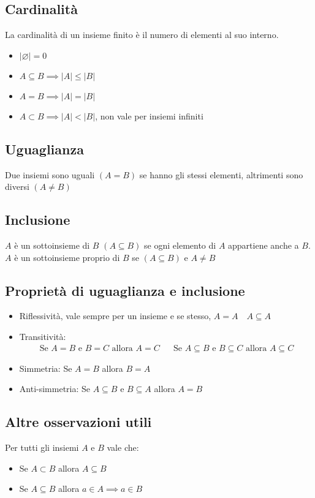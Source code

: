 \documentclass{article}
\begin{document}
\subsection*{Cardinalità}
La cardinalità di un insieme finito è il numero di elementi al suo interno.
\begin{itemize}
    \item \(\lvert \varnothing \rvert = 0\)
    \item \(A \subseteq B \implies \lvert A \rvert \leq \lvert B \rvert\)
    \item \(A = B \implies \lvert A \rvert = \lvert B\rvert \)
    \item \(A \subset B \implies \lvert A \rvert < \lvert B \rvert\), non vale per insiemi infiniti
\end{itemize}
\subsection*{Uguaglianza}
Due insiemi sono uguali \((A = B)\) se hanno gli stessi elementi, altrimenti sono diversi \((A \not= B)\)
\subsection*{Inclusione}
\(A\) è un sottoinsieme di \(B\) \((A \subseteq B)\) se ogni elemento di \(A\) appartiene anche a \(B\).
\(A\) è un sottoinsieme proprio di \(B\) se  \((A \subseteq B) \text{ e } A \neq B\)
\subsection*{Proprietà di uguaglianza e inclusione}
\begin{itemize}
    \item Riflessività, vale sempre per un insieme e se stesso, \(A = A \quad A \subseteq A\)
    \item Transitività:
          \begin{align*}
              \text{Se } A = B \text{ e } B = C \text{ allora } A = C &  & \text{Se } A \subseteq B \text{ e } B \subseteq C \text{ allora } A \subseteq C
          \end{align*}
    \item Simmetria: Se \(A = B\) allora \(B = A\)
    \item Anti-simmetria: Se \(A \subseteq B\) e \(B \subseteq A\) allora \(A = B\)
\end{itemize}
\subsection*{Altre osservazioni utili}
Per tutti gli insiemi \(A\) e \(B\) vale che:
\begin{itemize}
    \item Se \(A \subset B\) allora \(A \subseteq B\)
    \item Se \(A \subseteq B\) allora \(a \in A \implies a \in B\)
\end{itemize}
\end{document}
